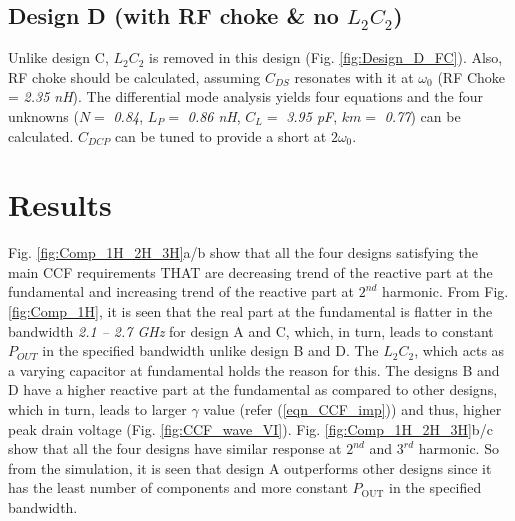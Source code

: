 \documentclass[conference]{IEEEtran}
\begin{document}
\subsection{Design D (with RF choke \& no $L_2C_2$)}
 Unlike design C, $L_2C_2$ is removed in this design (Fig. \ref{fig:Design_D_FC}). Also, RF choke should be calculated, assuming $C_{DS}$ resonates with it at $\omega_0$ (RF Choke = \textit{2.35 nH}).
The differential mode analysis yields four equations and the four unknowns ($N =$ \textit{0.84}, $L_P =$ \textit{0.86 nH}, $C_L =$ \textit{3.95 pF}, $km =$ \textit{0.77}) can be calculated.
$C_{DCP}$ can be tuned to provide a short at $2\omega_0$.

\section{Results}
\label{section:Results}

Fig. \ref{fig:Comp_1H_2H_3H}a/b show that all the four designs satisfying the main CCF requirements THAT are decreasing trend of the reactive part at the fundamental and increasing trend of the reactive part at $2^{nd}$ harmonic.
From Fig. \ref{fig:Comp_1H}, it is seen that the real part at the fundamental is flatter in the bandwidth \textit{2.1 -- 2.7 GHz} for design A and C, which, in turn, leads to constant $P_{OUT}$ in the specified bandwidth unlike design B and D. The $L_2C_2$, which acts as a varying capacitor at fundamental holds the reason for this. The designs B and D have a higher reactive part at the fundamental as compared to other designs, which in turn, leads to larger $\gamma$ value (refer (\ref{eqn_CCF_imp})) and thus, higher peak drain voltage (Fig. \ref{fig:CCF_wave_VI}). Fig. \ref{fig:Comp_1H_2H_3H}b/c show that all the four designs have similar response at $2^{nd}$ and $3^{rd}$ harmonic. 
So from the simulation, it is seen that design A outperforms other designs since it has the least number of components and more constant $P_{\text{OUT}}$ in the specified bandwidth.
\end{document}
